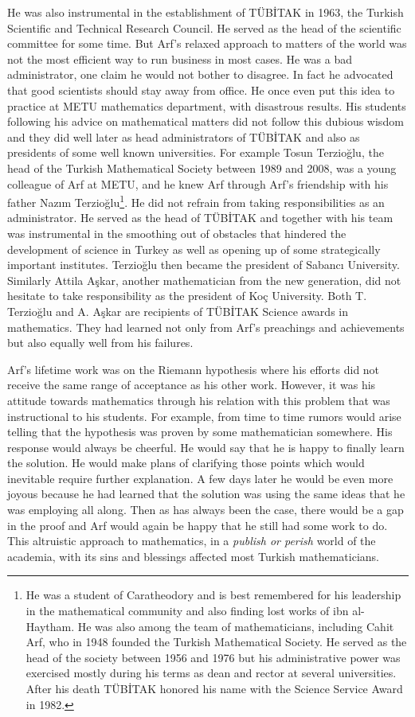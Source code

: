 \documentclass[12pt]{amsart}
\begin{document}
He was also instrumental in the establishment of T\"{U}B{\.I}TAK in 1963, the Turkish Scientific and Technical Research Council. He served as the head of the scientific committee for some time. But Arf's relaxed approach to matters of the world was not the most efficient way to run business in most cases. He was a bad administrator, one claim he would not bother to disagree. In fact he advocated that good scientists should stay away from office.
He once even put this idea to practice at METU mathematics department, with disastrous results.
His students following his advice on mathematical matters did not follow this dubious wisdom and they did well later as head administrators of T\"{U}B{\.I}TAK and also as presidents of some well known universities. For example Tosun Terzio\u{g}lu, the head of the Turkish Mathematical Society between 1989 and 2008,  was a young colleague of Arf at METU, and  he knew Arf through Arf's friendship with his father Naz{\i}m Terzio\u{g}lu\footnote{He was a student of Caratheodory and  is best remembered for his leadership in the mathematical community and also finding lost works of  ibn al-Haytham. He was also among the team of mathematicians, including Cahit Arf, who in 1948 founded the Turkish Mathematical Society. He served as the head of the society between 1956 and 1976 but his administrative power was exercised mostly during his terms as dean and rector at several universities. After his death T\"{U}B{\.I}TAK honored his name with the Science Service Award in 1982.}. He did not refrain from taking responsibilities as an administrator. He served as the head of T\"{U}B{\.I}TAK and together with his team was instrumental in the smoothing out of obstacles that hindered the development of science in Turkey as well as opening up of some strategically important institutes. Terzio\u{g}lu then became the president of Sabanc{\i} University. Similarly Attila A\c{s}kar, another mathematician from the new generation, did not hesitate to take responsibility as the president of Ko\c{c} University. Both T. Terzio\u{g}lu and A. A\c{s}kar are recipients of T\"{U}B{\.I}TAK Science awards in mathematics. They had learned not only from Arf's preachings  and achievements but also equally well  from his  failures.

Arf's lifetime work was on the Riemann hypothesis where his efforts did not receive the same range of acceptance as his other work. However, it was his attitude towards mathematics through his relation with this problem that was instructional to his students. For example, from time to time rumors would arise telling   that the hypothesis was proven by some  mathematician somewhere. His response would always be cheerful. He would say that he is happy to finally learn the solution. He would make plans of clarifying those points which would inevitable require further explanation. A few days later he would be even more joyous because he had learned that the solution was using the same ideas that he was employing all along. Then as has always been the case, there would be a gap in the proof and Arf would again be happy that he still had some work to do. This altruistic approach to mathematics, in a \emph{publish or perish} world of the academia, with its sins and blessings affected most Turkish mathematicians.
\end{document}
